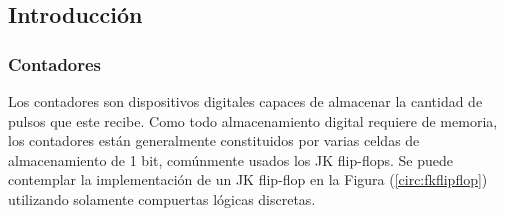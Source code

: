 


\subsection{Introducción}
\subsubsection{Contadores}
		Los contadores son dispositivos digitales capaces de almacenar la cantidad de pulsos que este recibe. Como todo almacenamiento digital requiere de memoria, los contadores están generalmente constituidos por varias celdas de almacenamiento de 1 bit, comúnmente usados los JK flip-flops. Se puede contemplar la implementación de un JK flip-flop en la Figura (\ref{circ:fkflipflop}) utilizando solamente compuertas lógicas discretas. 


